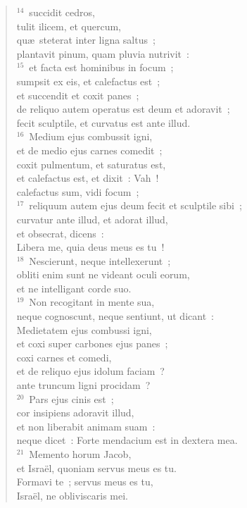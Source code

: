 \begin{verse}
${}^{14}$~succidit cedros,\\ tulit ilicem, et quercum,\\ qu\ae\ steterat inter ligna saltus~;\\ plantavit pinum, quam pluvia nutrivit~:\\
${}^{15}$~et facta est hominibus in focum~;\\ sumpsit ex eis, et calefactus est~;\\ et succendit et coxit panes~;\\ de reliquo autem operatus est deum et adoravit~;\\ fecit sculptile, et curvatus est ante illud.\\
${}^{16}$~Medium ejus combussit igni,\\ et de medio ejus carnes comedit~;\\ coxit pulmentum, et saturatus est,\\ et calefactus est, et dixit~: Vah~!\\ calefactus sum, vidi focum~;\\
${}^{17}$~reliquum autem ejus deum fecit et sculptile sibi~;\\ curvatur ante illud, et adorat illud,\\ et obsecrat, dicens~:\\ Libera me, quia deus meus es tu~!\\
${}^{18}$~Nescierunt, neque intellexerunt~;\\ obliti enim sunt ne videant oculi eorum,\\ et ne intelligant corde suo.\\
${}^{19}$~Non recogitant in mente sua,\\ neque cognoscunt, neque sentiunt, ut dicant~:\\ Medietatem ejus combussi igni,\\ et coxi super carbones ejus panes~;\\ coxi carnes et comedi,\\ et de reliquo ejus idolum faciam~?\\ ante truncum ligni procidam~?\\
${}^{20}$~Pars ejus cinis est~;\\ cor insipiens adoravit illud,\\ et non liberabit animam suam~:\\ neque dicet~: Forte mendacium est in dextera mea.\\
${}^{21}$~Memento horum Jacob,\\ et Isra\"el, quoniam servus meus es tu.\\ Formavi te~; servus meus es tu,\\ Isra\"el, ne obliviscaris mei.\\

\end{verse}
